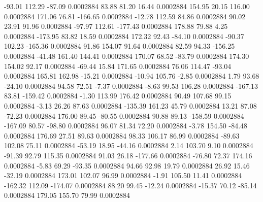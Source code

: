       -93.01      112.29      -87.09     0.0002884
       83.88       81.20       16.44     0.0002884
      154.95       20.15      116.00     0.0002884
      171.06       76.81     -166.65     0.0002884
      -12.78      112.59       84.86     0.0002884
       90.02       23.91       91.96     0.0002884
      -97.97      112.61     -177.43     0.0002884
      178.88       79.88        4.25     0.0002884
     -173.95       83.82       18.59     0.0002884
      172.32       92.43      -84.10     0.0002884
      -90.37      102.23     -165.36     0.0002884
       91.86      154.07       91.64     0.0002884
       82.59       94.33     -156.25     0.0002884
      -41.48      161.40      144.41     0.0002884
      170.07       68.52      -83.79     0.0002884
      174.30      154.02       92.17     0.0002884
      -69.44       15.84      171.65     0.0002884
       76.06      114.47      -93.04     0.0002884
      165.81      162.98      -15.21     0.0002884
      -10.94      105.76       -2.85     0.0002884
        1.79       93.68      -24.10     0.0002884
       94.58       72.51       -7.37     0.0002884
       -8.63       99.53      106.28     0.0002884
     -167.13       83.81     -159.42     0.0002884
       -1.30      113.99      176.42     0.0002884
       90.49      107.68       99.15     0.0002884
       -3.13       26.26       87.63     0.0002884
     -135.39      161.23       45.79     0.0002884
       13.21       87.08      -72.23     0.0002884
      176.00       89.45      -80.55     0.0002884
       90.88       89.13     -158.59     0.0002884
     -167.09       80.57      -98.80     0.0002884
       96.07       81.34       72.20     0.0002884
       -3.78      154.50      -84.48     0.0002884
      176.69       27.51       89.63     0.0002884
       98.33      106.17       86.99     0.0002884
      -89.63      102.08       75.11     0.0002884
      -53.19       18.95      -44.16     0.0002884
        2.14      103.70        9.10     0.0002884
      -91.39       92.79      115.35     0.0002884
       91.03       26.18     -177.66     0.0002884
      -76.80       72.37      174.16     0.0002884
       -5.83       69.29      -93.35     0.0002884
       94.66       92.98       19.79     0.0002884
       26.92       15.46      -32.19     0.0002884
      173.01      102.07       96.99     0.0002884
       -1.91      105.50       11.41     0.0002884
     -162.32      112.09     -174.07     0.0002884
       88.20       99.45      -12.24     0.0002884
      -15.37       70.12      -85.14     0.0002884
      179.05      155.70       79.99     0.0002884
